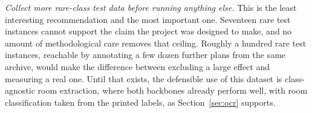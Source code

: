 \emph{Collect more rare-class test data before running anything else.} This is
the least interesting recommendation and the most important one. Seventeen rare
test instances cannot support the claim the project was designed to make, and no
amount of methodological care removes that ceiling. Roughly a hundred rare test
instances, reachable by annotating a few dozen further plans from the same
archive, would make the difference between excluding a large effect and
measuring a real one. Until that exists, the defensible use of this dataset is
class-agnostic room extraction, where both backbones already perform well, with
room classification taken from the printed labels, as Section~\ref{sec:ocr}
supports.
